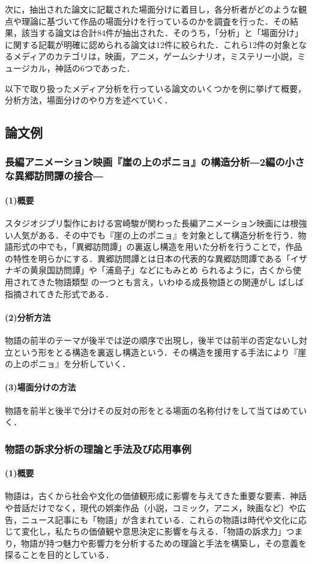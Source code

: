 次に，抽出された論文に記載された場面分けに着目し，各分析者がどのような観点や理論に基づいて作品の場面分けを行っているのかを調査を行った．その結果，該当する論文は合計84件が抽出された．そのうち，「分析」と「場面分け」に関する記載が明確に認められる論文は12件に絞られた．これら12件の対象となるメディアのカテゴリは，映画，アニメ，ゲームシナリオ，ミステリー小説，ミュージカル，神話の6つであった．

以下で取り扱ったメディア分析を行っている論文のいくつかを例に挙げて概要，分析方法，場面分けのやり方を述べていく．


\subsection{論文例}
\subsubsection{長編アニメーション映画『崖の上のポニョ』の構造分析―2編の小さな異郷訪問譚の接合―}
\paragraph*{(1)概要}
スタジオジブリ製作における宮崎駿が関わった長編アニメーション映画には根強い人気がある．その中でも『崖の上のポニョ』を対象として構造分析を行う\cite{ponyo}．物語形式の中でも，「異郷訪問譚」の裏返し構造を用いた分析を行うことで，作品の特性を明らかにする．異郷訪問譚とは日本の代表的な異郷訪問譚である「イザナギの黄泉国訪問譚」や「浦島子」などにもみとめ られるように，古くから使用されてきた物語類型 の一つとも言え，いわゆる成長物語との関連がし ばしば指摘されてきた形式である．
\paragraph*{(2)分析方法}
物語の前半のテーマが後半では逆の順序で出現し，後半では前半の否定ないし対立という形をとる構造を裏返し構造という．その構造を援用する手法により『崖の上のポニョ』を分析していく．
\paragraph*{(3)場面分けの方法}
物語を前半と後半で分けその反対の形をとる場面の名称付けをして当てはめていく．

\subsubsection{物語の訴求分析の理論と手法及び応用事例}
\paragraph*{(1)概要}
物語は，古くから社会や文化の価値観形成に影響を与えてきた重要な要素．神話や昔話だけでなく，現代の娯楽作品（小説，コミック，アニメ，映画など）や広告，ニュース記事にも「物語」が含まれている．これらの物語は時代や文化に応じて変化し，私たちの価値観や意思決定に影響を与える\cite{sokyu}．「物語の訴求力」つまり，物語が持つ魅力や影響力を分析するための理論と手法を構築し，その意義を探ることを目的としている．
